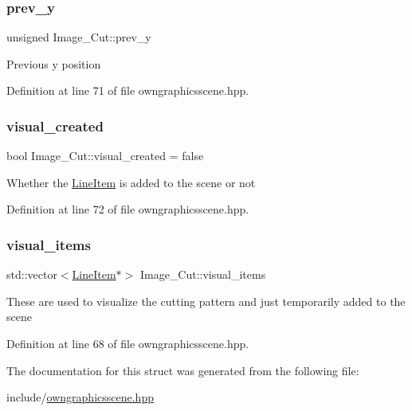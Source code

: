 \subsubsection{\texorpdfstring{prev\+\_\+y}{prev\_y}}
{\footnotesize\ttfamily unsigned Image\+\_\+\+Cut\+::prev\+\_\+y}

Previous y position 

Definition at line 71 of file owngraphicsscene.\+hpp.

\mbox{\label{structImage__Cut_acbae7507f135d85e9f2f9724fbc2a643}} 
\subsubsection{\texorpdfstring{visual\+\_\+created}{visual\_created}}
{\footnotesize\ttfamily bool Image\+\_\+\+Cut\+::visual\+\_\+created = false}

Whether the \mbox{\hyperlink{classLineItem}{Line\+Item}} is added to the scene or not 

Definition at line 72 of file owngraphicsscene.\+hpp.

\mbox{\label{structImage__Cut_ad56f1d72a3d7c5488fec27eaf5c6fbd9}} 
\subsubsection{\texorpdfstring{visual\+\_\+items}{visual\_items}}
{\footnotesize\ttfamily std\+::vector$<$\mbox{\hyperlink{classLineItem}{Line\+Item}}$\ast$$>$ Image\+\_\+\+Cut\+::visual\+\_\+items}

These are used to visualize the cutting pattern and just temporarily added to the scene 

Definition at line 68 of file owngraphicsscene.\+hpp.



The documentation for this struct was generated from the following file\+:\begin{DoxyCompactItemize}
\item 
include/\mbox{\hyperlink{owngraphicsscene_8hpp}{owngraphicsscene.\+hpp}}\end{DoxyCompactItemize}
